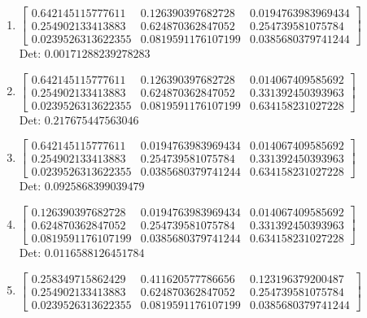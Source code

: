 \documentclass[12pt]{article}
\begin{document}
\begin{enumerate}
\item $\displaystyle \left[\begin{matrix}0.642145115777611 & 0.126390397682728 & 0.0194763983969434\\0.254902133413883 & 0.624870362847052 & 0.254739581075784\\0.0239526313622355 & 0.0819591176107199 & 0.0385680379741244\end{matrix}\right]$\\

Det: $0.00171288239278283$\\

\item $\displaystyle \left[\begin{matrix}0.642145115777611 & 0.126390397682728 & 0.014067409585692\\0.254902133413883 & 0.624870362847052 & 0.331392450393963\\0.0239526313622355 & 0.0819591176107199 & 0.634158231027228\end{matrix}\right]$\\

Det: $0.217675447563046$\\

\item $\displaystyle \left[\begin{matrix}0.642145115777611 & 0.0194763983969434 & 0.014067409585692\\0.254902133413883 & 0.254739581075784 & 0.331392450393963\\0.0239526313622355 & 0.0385680379741244 & 0.634158231027228\end{matrix}\right]$\\

Det: $0.0925868399039479$\\

\item $\displaystyle \left[\begin{matrix}0.126390397682728 & 0.0194763983969434 & 0.014067409585692\\0.624870362847052 & 0.254739581075784 & 0.331392450393963\\0.0819591176107199 & 0.0385680379741244 & 0.634158231027228\end{matrix}\right]$\\

Det: $0.0116588126451784$\\

\item $\displaystyle \left[\begin{matrix}0.258349715862429 & 0.411620577786656 & 0.123196379200487\\0.254902133413883 & 0.624870362847052 & 0.254739581075784\\0.0239526313622355 & 0.0819591176107199 & 0.0385680379741244\end{matrix}\right]$\\


\end{enumerate}
\end{document}
